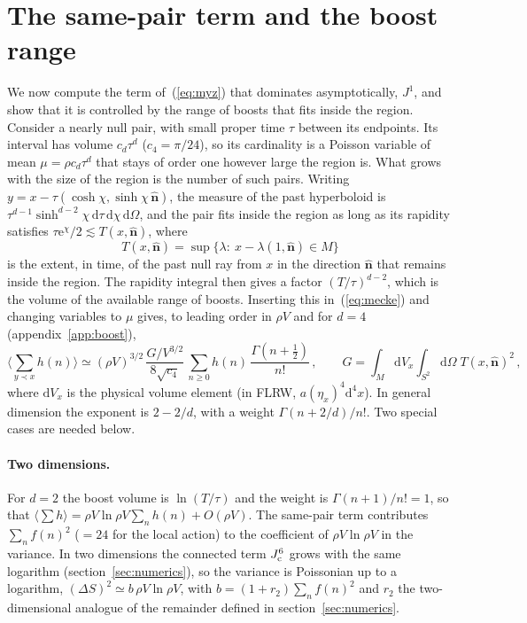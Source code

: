 \documentclass{iopjournal}
\newcommand{\eref}[1]{(\ref{#1})}
\newcommand{\rmd}{\mathrm{d}}
\newcommand{\rme}{\mathrm{e}}
\newcommand{\rhoV}{\rho V}
\newcommand{\Jone}{J^{1}}
\begin{document}
\section{The same-pair term and the boost range}
\label{sec:boost}

We now compute the term of~\eref{eq:myz} that dominates asymptotically,
$\Jone$, and show that it is controlled by the range of boosts that fits
inside the region. Consider a nearly null pair, with small proper time $\tau$
between its endpoints. Its interval has volume $c_d\tau^d$ ($c_4=\pi/24$), so its
cardinality is a Poisson variable of mean $\mu=\rho c_d\tau^d$ that stays of
order one however large the region is. What grows with the size of the
region is the number of such pairs. Writing
$y=x-\tau(\cosh\chi,\sinh\chi\,\hat{\boldsymbol n})$, the measure of the past
hyperboloid is $\tau^{d-1}\sinh^{d-2}\chi\,\rmd\tau\,\rmd\chi\,\rmd\Omega$,
and the pair fits inside the region as long as its rapidity satisfies
$\tau\rme^\chi/2\lesssim T(x,\hat{\boldsymbol n})$, where
\begin{equation}
T(x,\hat{\boldsymbol n})=\sup\{\lambda:\ x-\lambda(1,\hat{\boldsymbol n})\in M\}
\label{eq:ell}
\end{equation}
is the extent, in time, of the past null ray from $x$ in the direction
$\hat{\boldsymbol n}$ that remains inside the region. The rapidity integral
then gives a factor $(T/\tau)^{d-2}$, which is the volume of the available
range of boosts. Inserting this in~\eref{eq:mecke} and changing variables to
$\mu$ gives, to leading order in $\rhoV$ and for $d=4$ (appendix~\ref{app:boost}),
\begin{equation}
\Big\langle\sum_{y\prec x}h(n)\Big\rangle\simeq(\rhoV)^{3/2}\,
\frac{G/V^{3/2}}{8\sqrt{c_4}}\,\sum_{n\ge0}h(n)\,\frac{\Gamma(n+\frac12)}{n!}\,,
\qquad
G=\int_M\rmd V_x\int_{S^2}\rmd\Omega\;T(x,\hat{\boldsymbol n})^2\,,
\label{eq:asym4}
\end{equation}
where $\rmd V_x$ is the physical volume element (in FLRW, $a(\eta_x)^4\rmd^4x$).
In general dimension the exponent is $2-2/d$, with a weight
$\Gamma(n+2/d)/n!$. Two special cases are needed below.

\paragraph{Two dimensions.} For $d=2$ the boost volume is
$\ln(T/\tau)$ and the weight is $\Gamma(n+1)/n!=1$, so that
$\langle\sum h\rangle=\rhoV\ln\rhoV\sum_n h(n)+O(\rhoV)$. The same-pair term
contributes $\sum_nf(n)^2$ ($=24$ for the local action) to the
coefficient of $\rhoV\ln\rhoV$ in the variance. In two dimensions the
connected term $J^6_{\rm c}$ grows with the same logarithm (section~\ref{sec:numerics}), so
the variance is Poissonian up to a logarithm,
$(\Delta S)^2\simeq b\,\rhoV\ln\rhoV$, with $b=(1+r_2)\sum_nf(n)^2$ and $r_2$
the two-dimensional analogue of the remainder defined in
section~\ref{sec:numerics}.
\end{document}
